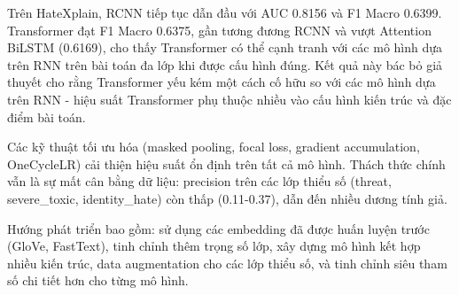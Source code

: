 \documentclass[../BTL.tex]{subfiles}
\begin{document}
Trên HateXplain, RCNN tiếp tục dẫn đầu với AUC 0.8156 và F1 Macro 0.6399. Transformer đạt F1 Macro 0.6375, gần tương đương RCNN và vượt Attention BiLSTM (0.6169), cho thấy Transformer có thể cạnh tranh với các mô hình dựa trên RNN trên bài toán đa lớp khi được cấu hình đúng. Kết quả này bác bỏ giả thuyết cho rằng Transformer yếu kém một cách cố hữu so với các mô hình dựa trên RNN - hiệu suất Transformer phụ thuộc nhiều vào cấu hình kiến trúc và đặc điểm bài toán.

Các kỹ thuật tối ưu hóa (masked pooling, focal loss, gradient accumulation, OneCycleLR) cải thiện hiệu suất ổn định trên tất cả mô hình. Thách thức chính vẫn là sự mất cân bằng dữ liệu: precision trên các lớp thiểu số (threat, severe\_toxic, identity\_hate) còn thấp (0.11-0.37), dẫn đến nhiều dương tính giả.

Hướng phát triển bao gồm: sử dụng các embedding đã được huấn luyện trước (GloVe, FastText), tinh chỉnh thêm trọng số lớp, xây dựng mô hình kết hợp nhiều kiến trúc, data augmentation cho các lớp thiểu số, và tinh chỉnh siêu tham số chi tiết hơn cho từng mô hình.
\end{document}
